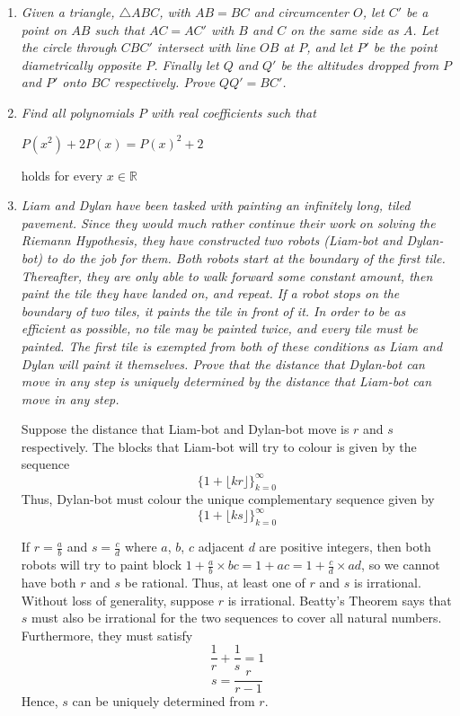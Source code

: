 \documentclass{article}
\begin{document}
\begin{enumerate}
\medskip
\item %
{\itshape Given a triangle, $\triangle ABC$, with $AB = BC$ and circumcenter $O$, let $C'$ be a point on $AB$ such that $AC = AC'$ with $B$ and $C$ on the same side as $A$. Let the circle through $CBC'$ intersect with line $OB$ at $P$, and let $P'$ be the point diametrically opposite $P$. Finally let $Q$ and $Q'$ be the altitudes dropped from $P$ and $P'$ onto $BC$ respectively. Prove $QQ' = BC'$.
}


\medskip
\item %
{\itshape Find all polynomials $P$ with real coefficients such that
\begin{center}
    $P(x^2) + 2P(x) = {P(x)}^2 + 2$
\end{center}
holds for every $x\in\mathbb{R}$
}


\medskip
\item %
{\itshape Liam and Dylan have been tasked with painting an infinitely long, tiled pavement. Since they would much rather continue their work on solving the Riemann Hypothesis, they have constructed two robots (Liam-bot and Dylan-bot) to do the job for them. Both robots start at the boundary of the first tile. Thereafter, they are only able to walk forward some constant amount, then paint the tile they have landed on, and repeat. If a robot stops on the boundary of two tiles, it paints the tile in front of it. In order to be as efficient as possible, no tile may be painted twice, and every tile must be painted. The first tile is exempted from both of these conditions as Liam and Dylan will paint it themselves. Prove that the distance that Dylan-bot can move in any step is uniquely determined by the distance that Liam-bot can move in any step.
}

Suppose the distance that Liam-bot and Dylan-bot move is $r$ and $s$ respectively. The blocks that Liam-bot will try to colour is given by the sequence
$$\{1 + \lfloor kr \rfloor\}_{k=0}^{\infty} $$
Thus, Dylan-bot must colour the unique complementary sequence given by
$$\{1 + \lfloor ks \rfloor\}_{k=0}^{\infty} $$

If $r = \frac{a}{b}$ and $s = \frac{c}{d}$ where $a$, $b$, $c$ adjacent $d$ are positive integers, then both robots will try to paint block $1 + \frac{a}{b} \times bc = 1 + ac = 1 + \frac{c}{d} \times ad$, so we cannot have both $r$ and $s$ be rational. Thus, at least one of $r$ and $s$ is irrational. Without loss of generality, suppose $r$ is irrational. Beatty's Theorem says that $s$ must also be irrational for the two sequences to cover all natural numbers. Furthermore, they must satisfy
$$\frac{1}{r} + \frac{1}{s} = 1$$
$$ s = \frac{r}{r - 1}$$
Hence, $s$ can be uniquely determined from $r$.



\end{enumerate}
\end{document}
